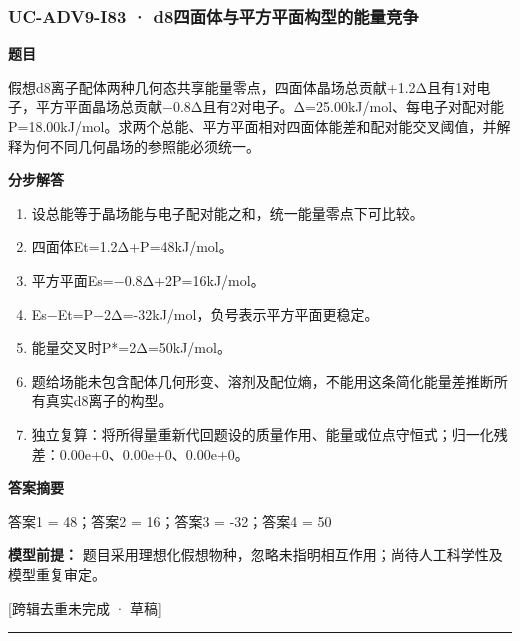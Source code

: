 \documentclass[UTF8,11pt,a4paper]{ctexart}
\begin{document}
\subsubsection*{UC-ADV9-I83 · d8四面体与平方平面构型的能量竞争}
\noindent\textbf{题目}\par
假想d8离子配体两种几何态共享能量零点，四面体晶场总贡献+1.2Δ且有1对电子，平方平面晶场总贡献−0.8Δ且有2对电子。Δ=25.00kJ/mol、每电子对配对能P=18.00kJ/mol。求两个总能、平方平面相对四面体能差和配对能交叉阈值，并解释为何不同几何晶场的参照能必须统一。\par
\medskip\noindent\textbf{分步解答}
\begin{enumerate}
\item 设总能等于晶场能与电子配对能之和，统一能量零点下可比较。
\item 四面体Et=1.2Δ+P=48kJ/mol。
\item 平方平面Es=−0.8Δ+2P=16kJ/mol。
\item Es−Et=P−2Δ=-32kJ/mol，负号表示平方平面更稳定。
\item 能量交叉时P*=2Δ=50kJ/mol。
\item 题给场能未包含配体几何形变、溶剂及配位熵，不能用这条简化能量差推断所有真实d8离子的构型。
\item 独立复算：将所得量重新代回题设的质量作用、能量或位点守恒式；归一化残差：0.00e+0、0.00e+0、0.00e+0。
\end{enumerate}
\noindent\textbf{答案摘要}\par
答案1 = 48；答案2 = 16；答案3 = -32；答案4 = 50\par
\noindent\textbf{模型前提：}
题目采用理想化假想物种，忽略未指明相互作用；尚待人工科学性及模型重复审定。\par
\noindent\textcolor{red!65!black}{[跨辑去重未完成 · 草稿]} \par
\medskip\hrule\medskip
{}
\end{document}
